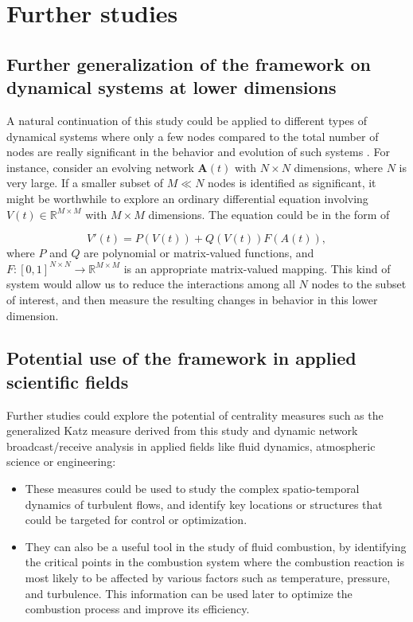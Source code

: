 
\chapter{Further studies}
\label{chap:further}
 
\section*{Further generalization of the framework on dynamical systems at lower dimensions}
A natural continuation of this study could be applied to different types of dynamical systems where only a few nodes compared to the total number of nodes are really significant in the behavior and evolution of such systems \cite{grindrod2014dynamical}. For instance, consider an evolving network $\mathbf{A}(t)$ with $N \times N$ dimensions, where $N$ is very large. If a smaller subset of $M\ll N$ nodes is identified as significant, it might be worthwhile to explore an ordinary differential equation involving $V(t)\in \mathbb{R}^{M\times M}$ with $M\times M$ dimensions. The equation could be in the form of 

$$V'(t)=P(V(t)) + Q(V(t))F(A(t)),$$ where $P$ and $Q$ are polynomial or matrix-valued functions, and $F: [0, 1]^{N×N} \to \mathbb{R}^{M\times M}$ is an appropriate matrix-valued mapping. This kind of system would allow us to reduce the interactions among all $N$ nodes to the subset of interest, and then measure the resulting changes in behavior in this lower dimension.

\section*{Potential use of the framework in applied scientific fields} 
Further studies could explore the potential of centrality measures such as the generalized Katz measure derived from this study and dynamic network broadcast/receive analysis in applied fields like fluid dynamics, atmospheric science or engineering: 

\begin{itemize}
  \item These measures could be used to study the complex spatio-temporal dynamics of turbulent flows, and identify key locations or structures that could be targeted for control or optimization. 
  \item They can also be a useful tool in the study of fluid combustion, by identifying the critical points in the combustion system where the combustion reaction is most likely to be affected by various factors such as temperature, pressure, and turbulence. This information can be used later to optimize the combustion process and improve its efficiency.
\end{itemize}
	
